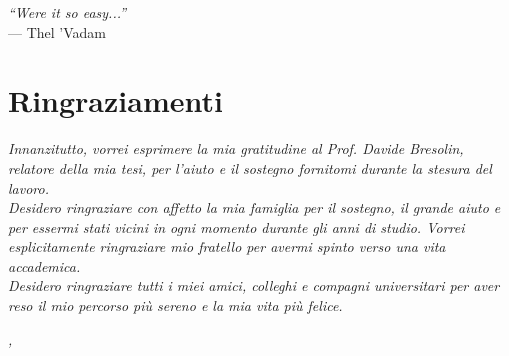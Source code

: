 \cleardoublepage
{}
{}

\begin{flushright}{
    \slshape
    ``Were it so easy...''} \\
    \medskip
    --- Thel 'Vadam
\end{flushright}


\bigskip

\begingroup
\let\clearpage\relax
\let\cleardoublepage\relax
\let\cleardoublepage\relax

\chapter*{Ringraziamenti}

\noindent \textit{Innanzitutto, vorrei esprimere la mia gratitudine al Prof. Davide Bresolin, relatore della mia tesi, per l'aiuto e il sostegno fornitomi durante la stesura del lavoro.}\\

\noindent \textit{Desidero ringraziare con affetto la mia famiglia per il sostegno, il grande aiuto e per essermi stati vicini in ogni momento durante gli anni di studio. Vorrei esplicitamente ringraziare mio fratello per avermi spinto verso una vita accademica.}\\

\noindent \textit{Desidero ringraziare tutti i miei amici, colleghi e compagni universitari per aver reso il mio percorso più sereno e la mia vita più felice.}\\
\bigskip

\noindent\textit{\myLocation, \myTime}
\hfill \myName

\endgroup
